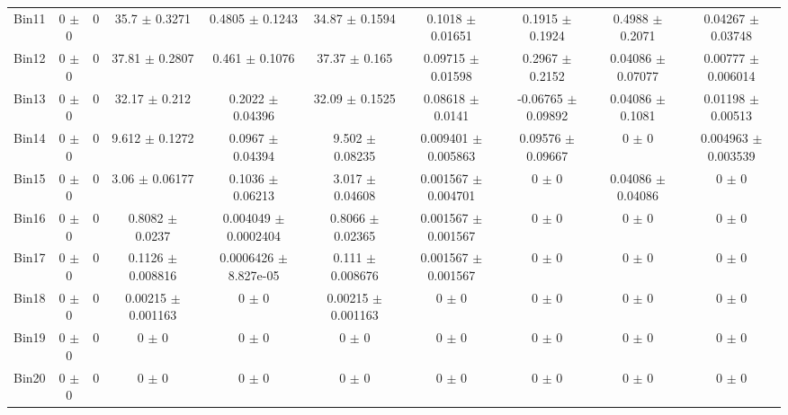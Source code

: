 \begin{tabular}{@{\extracolsep{4pt}}lccccccccc@{}}
     Bin11 & 0 $\pm$ 0 & 0 & 35.7 $\pm$ 0.3271 & 0.4805 $\pm$ 0.1243 & 34.87 $\pm$ 0.1594 & 0.1018 $\pm$ 0.01651 & 0.1915 $\pm$ 0.1924 & 0.4988 $\pm$ 0.2071 & 0.04267 $\pm$ 0.03748 \\ 
     Bin12 & 0 $\pm$ 0 & 0 & 37.81 $\pm$ 0.2807 & 0.461 $\pm$ 0.1076 & 37.37 $\pm$ 0.165 & 0.09715 $\pm$ 0.01598 & 0.2967 $\pm$ 0.2152 & 0.04086 $\pm$ 0.07077 & 0.00777 $\pm$ 0.006014 \\ 
     Bin13 & 0 $\pm$ 0 & 0 & 32.17 $\pm$ 0.212 & 0.2022 $\pm$ 0.04396 & 32.09 $\pm$ 0.1525 & 0.08618 $\pm$ 0.0141 & -0.06765 $\pm$ 0.09892 & 0.04086 $\pm$ 0.1081 & 0.01198 $\pm$ 0.00513 \\ 
     Bin14 & 0 $\pm$ 0 & 0 & 9.612 $\pm$ 0.1272 & 0.0967 $\pm$ 0.04394 & 9.502 $\pm$ 0.08235 & 0.009401 $\pm$ 0.005863 & 0.09576 $\pm$ 0.09667 & 0 $\pm$ 0 & 0.004963 $\pm$ 0.003539 \\ 
     Bin15 & 0 $\pm$ 0 & 0 & 3.06 $\pm$ 0.06177 & 0.1036 $\pm$ 0.06213 & 3.017 $\pm$ 0.04608 & 0.001567 $\pm$ 0.004701 & 0 $\pm$ 0 & 0.04086 $\pm$ 0.04086 & 0 $\pm$ 0 \\ 
     Bin16 & 0 $\pm$ 0 & 0 & 0.8082 $\pm$ 0.0237 & 0.004049 $\pm$ 0.0002404 & 0.8066 $\pm$ 0.02365 & 0.001567 $\pm$ 0.001567 & 0 $\pm$ 0 & 0 $\pm$ 0 & 0 $\pm$ 0 \\ 
     Bin17 & 0 $\pm$ 0 & 0 & 0.1126 $\pm$ 0.008816 & 0.0006426 $\pm$ 8.827e-05 & 0.111 $\pm$ 0.008676 & 0.001567 $\pm$ 0.001567 & 0 $\pm$ 0 & 0 $\pm$ 0 & 0 $\pm$ 0 \\ 
     Bin18 & 0 $\pm$ 0 & 0 & 0.00215 $\pm$ 0.001163 & 0 $\pm$ 0 & 0.00215 $\pm$ 0.001163 & 0 $\pm$ 0 & 0 $\pm$ 0 & 0 $\pm$ 0 & 0 $\pm$ 0 \\ 
     Bin19 & 0 $\pm$ 0 & 0 & 0 $\pm$ 0 & 0 $\pm$ 0 & 0 $\pm$ 0 & 0 $\pm$ 0 & 0 $\pm$ 0 & 0 $\pm$ 0 & 0 $\pm$ 0 \\ 
     Bin20 & 0 $\pm$ 0 & 0 & 0 $\pm$ 0 & 0 $\pm$ 0 & 0 $\pm$ 0 & 0 $\pm$ 0 & 0 $\pm$ 0 & 0 $\pm$ 0 & 0 $\pm$ 0 \\ 
\hline\hline
  \end{tabular}

